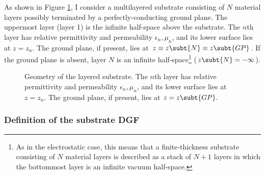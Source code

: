\documentclass[letterpaper]{article}
\begin{document}
As shown in Figure \ref{SubstrateGeometryFigure}, I consider
a multilayered substrate consisting of $N$ material layers
possibly terminated by a perfectly-conducting ground plane.
The uppermost layer (layer 1) is the infinite half-space
above the substrate.
The $n$th layer
has relative permittivity and permeability $\epsilon_n,\mu_n$,
and its lower surface lies at $z=z_n$.
The ground plane, if present,
lies at $z\equiv z\subt{N}\equiv z\subt{GP}$.
If the ground plane is absent, layer $N$ is an
infinite half-space\footnote{As in the electrostatic case,
this means that a finite-thickness substrate consisting of
$N$ material layers is described as a stack of $N+1$ layers
in which the bottommost layer is an infinite vacuum half-space.}
($z\subt{N}=-\infty$).
\begin{figure}[!]
\begin{center}
\caption{Geometry of the layered substrate.
The $n$th layer 
has relative permittivity and permeability $\epsilon_n,\mu_n$,
and its lower surface lies at $z=z_n$. The ground plane, if present,
lies at $z=z\subt{GP}.$
}
\label{SubstrateGeometryFigure}
\end{center}
\end{figure}

\subsubsection*{Definition of the substrate DGF}
\end{document}
